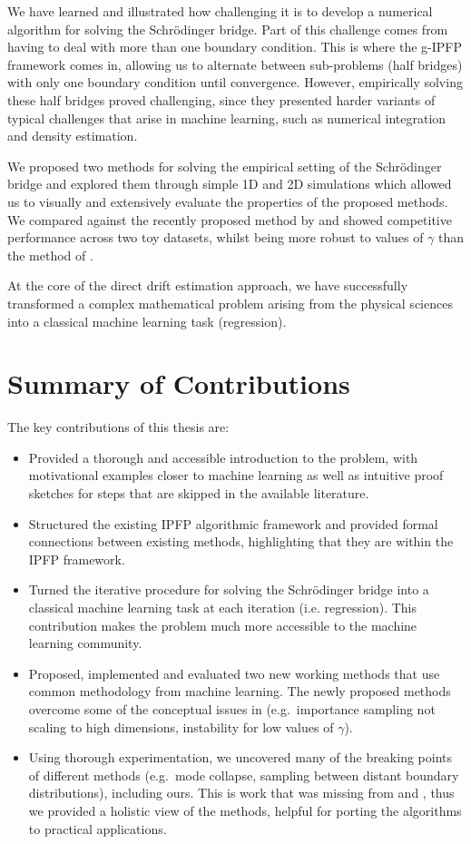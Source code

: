 \documentclass[a4paper,12pt,twoside,openright]{report}
\theoremstyle{definition}
\begin{document}
We have learned and illustrated how challenging it is to develop a numerical algorithm for solving the Schrödinger bridge. Part of this challenge comes from having to deal with more than one boundary condition. This is where the g-IPFP framework comes in, allowing us to alternate between sub-problems (half bridges) with only one boundary condition until convergence. However, empirically solving these half bridges proved challenging, since they presented harder variants of typical challenges that arise in machine learning, such as numerical integration and density estimation.

We proposed two methods for solving the empirical setting of the Schrödinger bridge and explored them through simple 1D and 2D simulations which allowed us to visually and extensively evaluate the properties of the proposed methods.  We compared against the recently proposed method by \cite{pavon2018data} and showed competitive performance across two toy datasets, whilst being more robust to values of $\gamma$ than the method of \citep{pavon2018data}.

At the core of the direct drift estimation approach, we have successfully transformed a complex mathematical problem arising from the physical sciences into a classical machine learning task (regression).

\section{Summary of Contributions}

The key contributions of this thesis are:

\begin{itemize}
    \item Provided a thorough and accessible introduction to the problem, with motivational examples closer to machine learning as well as intuitive proof sketches for steps that are skipped in the available literature.
    \item Structured the existing IPFP algorithmic framework and provided formal connections between existing methods, highlighting that they are within the IPFP framework.
    \item Turned the iterative procedure for solving the Schrödinger bridge into a classical machine learning task at each iteration (i.e. regression). This contribution makes the problem much more accessible to the machine learning community.
    \item Proposed, implemented and evaluated two new working methods that use common methodology from machine learning. The newly proposed methods overcome some of the conceptual issues in \cite{pavon2018data} (e.g.\ importance sampling not scaling to high dimensions, instability for low values of $\gamma$).
    \item Using thorough experimentation, we uncovered many of the breaking points of different methods (e.g.\ mode collapse, sampling between distant boundary distributions), including ours. This is work that was missing from \cite{pavon2018data} and \cite{bernton2019schr}, thus we provided a holistic view of the methods, helpful for porting the algorithms to practical applications.
\end{itemize}
\end{document}

